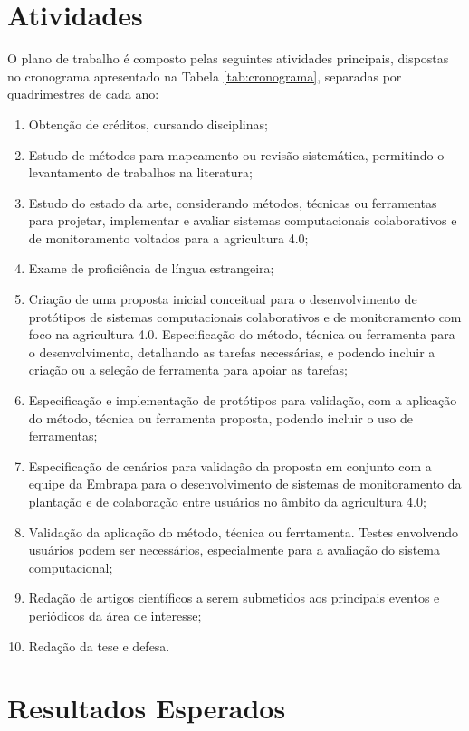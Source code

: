 \documentclass[12pt]{article}
\begin{document}
\section{Atividades}
\label{sec:atividades}

O plano de trabalho é composto pelas seguintes atividades principais, dispostas no cronograma apresentado na Tabela \ref{tab:cronograma}, separadas por quadrimestres de cada ano:

\begin{enumerate}
	\item Obtenção de créditos, cursando disciplinas;
	\item Estudo de métodos para mapeamento ou revisão sistemática, permitindo o levantamento de trabalhos na literatura;
	\item Estudo do estado da arte, considerando métodos, técnicas ou ferramentas para projetar, implementar e avaliar sistemas computacionais colaborativos e de monitoramento voltados para a agricultura 4.0;
	\item Exame de proficiência de língua estrangeira;
	\item Criação de uma proposta inicial conceitual para o desenvolvimento de protótipos de sistemas computacionais colaborativos e de monitoramento com foco na agricultura 4.0. Especificação do método, técnica ou ferramenta para o desenvolvimento, detalhando as tarefas necessárias, e podendo incluir a criação ou a seleção de ferramenta para apoiar as tarefas;
	\item Especificação e implementação de protótipos para validação, com a aplicação do método, técnica ou ferramenta proposta, podendo incluir o uso de ferramentas;
	\item Especificação de cenários para validação da proposta em conjunto com a equipe da Embrapa para o desenvolvimento de sistemas de monitoramento da plantação e de colaboração entre usuários no âmbito da agricultura 4.0;
	\item Validação da aplicação do método, técnica ou ferrtamenta. Testes envolvendo usuários podem ser necessários, especialmente para a avaliação do sistema computacional;
	\item Redação de artigos científicos a serem submetidos aos principais eventos e periódicos da área de interesse;
	\item Redação da tese e defesa.
\end{enumerate}

\section{Resultados Esperados}
\label{sec:resultados_esperados}
\end{document}
